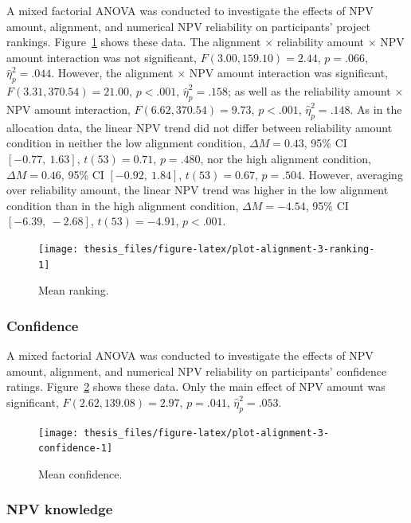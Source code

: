 \documentclass[a4paper, nobind, dvipsnames]{templates/ociamthesis}
\theoremstyle{definition}
\theoremstyle{definition}
\theoremstyle{definition}
\theoremstyle{definition}
\theoremstyle{remark}
\begin{document}
A mixed factorial ANOVA was conducted to investigate the effects of NPV amount,
alignment, and numerical NPV reliability on participants' project rankings.
Figure~\ref{fig:plot-alignment-3-ranking} shows these data. The alignment
\(\times\) reliability amount \(\times\) NPV amount interaction was not
significant,
\(F(3.00, 159.10) = 2.44\), \(p = .066\), \(\hat{\eta}^2_p = .044\).
However, the alignment \(\times\) NPV amount interaction was significant,
\(F(3.31, 370.54) = 21.00\), \(p < .001\), \(\hat{\eta}^2_p = .158\); as well as the reliability
amount \(\times\) NPV amount interaction,
\(F(6.62, 370.54) = 9.73\), \(p < .001\), \(\hat{\eta}^2_p = .148\). As in the
allocation data, the linear NPV trend did not differ between reliability amount
condition in neither the low alignment condition,
\(\Delta M = 0.43\), 95\% CI \([-0.77,~1.63]\), \(t(53) = 0.71\), \(p = .480\), nor the high alignment
condition, \(\Delta M = 0.46\), 95\% CI \([-0.92,~1.84]\), \(t(53) = 0.67\), \(p = .504\). However,
averaging over reliability amount, the linear NPV trend was higher in the low
alignment condition than in the high alignment condition,
\(\Delta M = -4.54\), 95\% CI \([-6.39,~-2.68]\), \(t(53) = -4.91\), \(p < .001\).



\begin{figure}
\texttt{[image: thesis\_files/figure-latex/plot-alignment-3-ranking-1]} \caption{Mean ranking.}\label{fig:plot-alignment-3-ranking}
\end{figure}

\subsubsection{Confidence}

A mixed factorial ANOVA was conducted to investigate the effects of NPV amount,
alignment, and numerical NPV reliability on participants' confidence ratings.
Figure~\ref{fig:plot-alignment-3-confidence} shows these data. Only the main
effect of NPV amount was significant,
\(F(2.62, 139.08) = 2.97\), \(p = .041\), \(\hat{\eta}^2_p = .053\).



\begin{figure}
\texttt{[image: thesis\_files/figure-latex/plot-alignment-3-confidence-1]} \caption{Mean confidence.}\label{fig:plot-alignment-3-confidence}
\end{figure}

\subsubsection{NPV knowledge}
\end{document}
